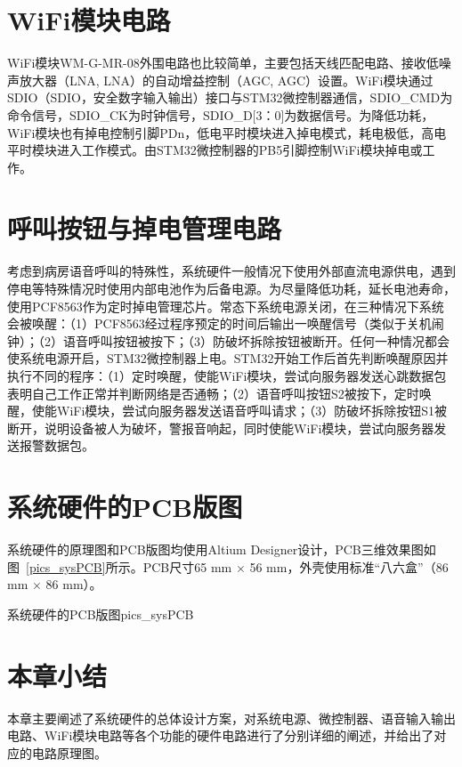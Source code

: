 \section{\acrshort{WiFi}模块电路}
\acrshort{WiFi}模块WM-G-MR-08外围电路也比较简单，主要包括天线匹配电路、接收低噪声放大器（\acrlong{LNA}, \acrshort{LNA}）的自动增益控制（\acrlong{AGC}, \acrshort{AGC}）设置。\acrshort{WiFi}模块通过
\acrshort{SDIO}（\acrlong{SDIO}，安全数字输入输出）接口与STM32微控制器通信，SDIO{\_}CMD为命令信号，SDIO{\_}CK为时钟信号，SDIO{\_}D[3：0]为数据信号。为降低功耗，\acrshort{WiFi}模块也有掉电控制引脚PDn，低电平时模块进入掉电模式，耗电极低，高电平时模块进入工作模式。由STM32微控制器的PB5引脚控制\acrshort{WiFi}模块掉电或工作。

\section{呼叫按钮与掉电管理电路}\label{sec:butn_pdwn}
考虑到病房语音呼叫的特殊性，系统硬件一般情况下使用外部直流电源供电，遇到停电等特殊情况时使用内部电池作为后备电源。为尽量降低功耗，延长电池寿命，使用PCF8563作为定时掉电管理芯片。常态下系统电源关闭，在三种情况下系统会被唤醒：（1）PCF8563经过程序预定的时间后输出一唤醒信号（类似于关机闹钟）；（2）语音呼叫按钮被按下；（3）防破坏拆除按钮被断开。任何一种情况都会使系统电源开启，STM32微控制器上电。STM32开始工作后首先判断唤醒原因并执行不同的程序：（1）定时唤醒，使能\acrshort{WiFi}模块，尝试向服务器发送心跳数据包表明自己工作正常并判断网络是否通畅；（2）语音呼叫按钮S2被按下，定时唤醒，使能\acrshort{WiFi}模块，尝试向服务器发送语音呼叫请求；（3）防破坏拆除按钮S1被断开，说明设备被人为破坏，警报音响起，同时使能\acrshort{WiFi}模块，尝试向服务器发送报警数据包。

\section{系统硬件的PCB版图}
系统硬件的原理图和PCB版图均使用Altium Designer设计，PCB三维效果图如图~\ref{pics_sysPCB}所示。PCB尺寸65 mm $\times$ 56 mm，外壳使用标准“八六盒”（86 mm $\times$ 86 mm）。
\begin{pics}[htbp]{系统硬件的PCB版图}{pics_sysPCB}
\end{pics}

\section{本章小结}
本章主要阐述了系统硬件的总体设计方案，对系统电源、微控制器、语音输入输出电路、\acrshort{WiFi}模块电路等各个功能的硬件电路进行了分别详细的阐述，并给出了对应的电路原理图。
